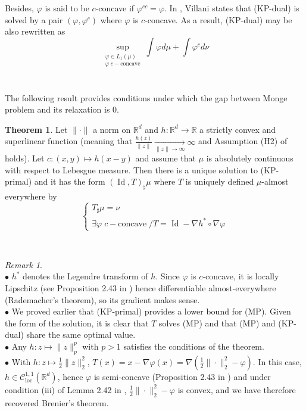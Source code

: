 \documentclass{article}
\theoremstyle{definition}
\newtheorem{thm}{Theorem}[section]
\theoremstyle{remark}
\newtheorem{rem}{Remark}
\DeclareMathOperator{\id}{Id}
\begin{document}
Besides, $\varphi$ is said to be $c$-concave if $\varphi^{cc}=\varphi$. In \cite{villani2003topics}, Villani states that (KP-dual) is solved by a pair $(\varphi, \varphi^c)$ where $\varphi$ is $c$-concave. As a result, (KP-dual) may be also rewritten as 
\begin{equation}\tag{KP-dual 4}
\sup_{\substack{\varphi \in L_1(\mu)\\ \varphi\; c-\text{concave}}} \int \varphi d\mu + \int \varphi^c d\nu
\end{equation}
\\
\\
The following result provides conditions under which the gap between Monge problem and its relaxation is $0$.
\begin{thm}
Let $\|\cdot\|$ a norm on $\mathbb R^d$ and $h:\mathbb R^d\to \mathbb R$ a strictly convex and superlinear function (meaning that $\frac{h(z)}{\|z\|}\xrightarrow[\|z\|\to \infty]{} \infty$ and Assumption (H2) of \cite{gangbo1996geometry} holds). Let $c:(x,y)\mapsto h(x-y)$ and assume that $\mu$ is absolutely continuous with respect to Lebesgue measure.
Then there is a unique solution to (KP-primal) and it has the form $(\id,T)_\sharp \mu$ where $T$ is uniquely defined $\mu$-almost everywhere by 
$$\begin{cases}
T_\sharp \mu = \nu\\
\exists \varphi \;c-\text{concave} \;/ T = \id - \nabla h^* \circ \nabla \varphi
\end{cases}$$
\end{thm}
\hfill
\\
\begin{rem}\hfill\\
$\bullet$ $h^*$ denotes the Legendre transform of $h$. Since $\varphi$ is $c$-concave, it is locally Lipschitz (see Proposition 2.43 in \cite{villani2003topics}) hence differentiable almost-everywhere (Rademacher's theorem), so its gradient makes sense.\\
$\bullet$ We proved earlier that (KP-primal) provides a lower bound for (MP). Given the form of the solution, it is clear that $T$ solves (MP) and that (MP) and (KP-dual) share the same optimal value.\\
$\bullet$ Any $h:z\mapsto \|z\|_p^p$ with $p>1$ satisfies the conditions of the theorem.\\
$\bullet$ With $h:z\mapsto \frac 12 \|z\|_2^2$, $T(x) = x - \nabla \varphi(x)=\nabla(\frac 12 \|\cdot\|_2^2 - \varphi)$. In this case, $h\in \mathcal C_{\text{loc}}^{1,1}(\mathbb R^d)$, hence $\varphi$ is semi-concave (Proposition 2.43 in \cite{villani2003topics}) and under condition (iii) of Lemma 2.42 in \cite{villani2003topics}, $\frac 12 \|\cdot\|_2^2 - \varphi$ is convex, and we have therefore recovered Brenier's theorem.
\end{rem}
\end{document}
